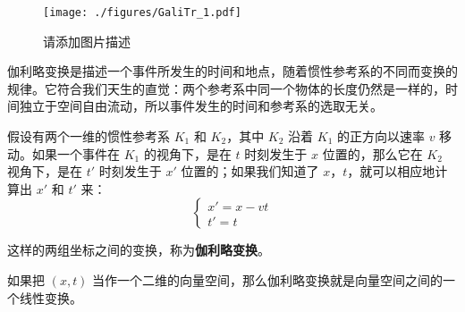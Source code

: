 

\begin{figure}[ht]
\centering
\texttt{[image: ./figures/GaliTr\_1.pdf]}
\caption{请添加图片描述} \label{GaliTr_fig1}
\end{figure}
伽利略变换是描述一个事件所发生的时间和地点，随着惯性参考系的不同而变换的规律。它符合我们天生的直觉：两个参考系中同一个物体的长度仍然是一样的，时间独立于空间自由流动，所以事件发生的时间和参考系的选取无关。

假设有两个一维的惯性参考系 $K_1$ 和 $K_2$，其中 $K_2$ 沿着 $K_1$ 的正方向以速率 $v$ 移动。如果一个事件在 $K_1$ 的视角下，是在 $t$ 时刻发生于 $x$ 位置的，那么它在 $K_2$ 视角下，是在 $t'$ 时刻发生于 $x'$ 位置的；如果我们知道了 $x$，$t$，就可以相应地计算出 $x'$ 和 $t'$ 来：
\begin{equation}
\begin{cases}
x' = x - vt\\
t' = t
\end{cases}
\end{equation}

这样的两组坐标之间的变换，称为\textbf{伽利略变换}。

如果把 $(x, t)$ 当作一个二维的向量空间，那么伽利略变换就是向量空间之间的一个线性变换。
